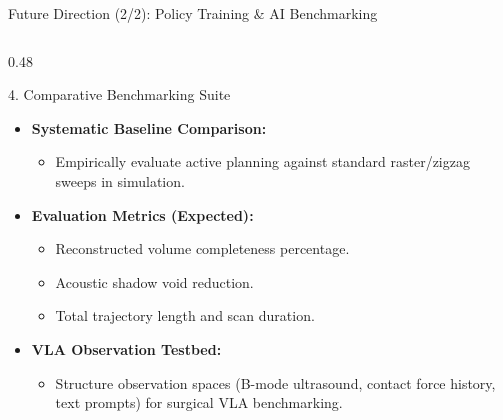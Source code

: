 \documentclass{if-beamer}
\begin{document}
\begin{frame}{Future Direction (2/2): Policy Training \& AI Benchmarking}
\begin{columns}[T]
        \begin{column}{0.48\textwidth}
            \begin{block}{4. Comparative Benchmarking Suite}
                \begin{itemize}\itemsep=3pt
                    \item \textbf{Systematic Baseline Comparison:}
                    \begin{itemize}\itemsep=1pt
                        \item Empirically evaluate active planning against standard raster/zigzag sweeps in simulation.
                    \end{itemize}
                    \item \textbf{Evaluation Metrics (Expected):}
                    \begin{itemize}\itemsep=1pt
                        \item Reconstructed volume completeness percentage.
                        \item Acoustic shadow void reduction.
                        \item Total trajectory length and scan duration.
                    \end{itemize}
                    \item \textbf{VLA Observation Testbed:}
                    \begin{itemize}\itemsep=1pt
                        \item Structure observation spaces (B-mode ultrasound, contact force history, text prompts) for surgical VLA benchmarking.
                    \end{itemize}
                \end{itemize}
            \end{block}
        \end{column}
    \end{columns}
\end{frame}
\end{document}
